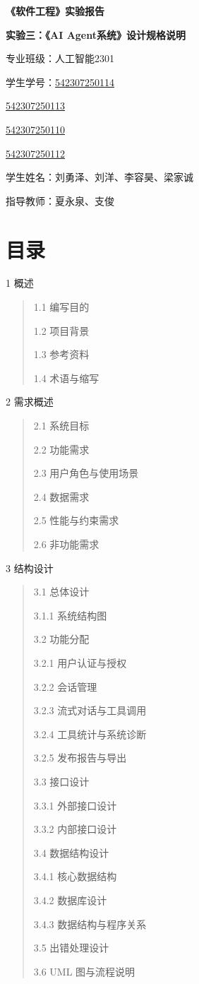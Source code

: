 \documentclass[UTF8]{ctexart}
\author{}
\date{}
\begin{document}
\textbf{《软件工程》实验报告}

\textbf{实验三：《AI Agent系统》设计规格说明}

专业班级：人工智能2301

学生学号：\ul{542307250114}

\ul{542307250113}

\ul{542307250110}

\ul{542307250112}

学生姓名：刘勇泽、刘洋、李容昊、梁家诚

指导教师：夏永泉、支俊

\section{\texorpdfstring{\textbf{目录}}{目录}}\label{ux76eeux5f55}

1 概述

\begin{quote}
1.1 编写目的

1.2 项目背景

1.3 参考资料

1.4 术语与缩写
\end{quote}

2 需求概述

\begin{quote}
2.1 系统目标

2.2 功能需求

2.3 用户角色与使用场景

2.4 数据需求

2.5 性能与约束需求

2.6 非功能需求
\end{quote}

3 结构设计

\begin{quote}
3.1 总体设计

3.1.1 系统结构图

3.2 功能分配

3.2.1 用户认证与授权

3.2.2 会话管理

3.2.3 流式对话与工具调用

3.2.4 工具统计与系统诊断

3.2.5 发布报告与导出

3.3 接口设计

3.3.1 外部接口设计

3.3.2 内部接口设计

3.4 数据结构设计

3.4.1 核心数据结构

3.4.2 数据库设计

3.4.3 数据结构与程序关系

3.5 出错处理设计

3.6 UML 图与流程说明
\end{quote}
\end{document}
